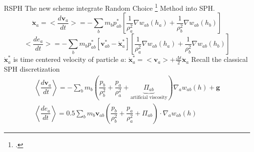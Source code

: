 \documentclass{beamer}
\begin{document}
\begin{frame}{RSPH}
The new scheme integrate Random Choice \footcite{chorin1976random} Method into SPH.
\begin{equation}
\ddot{\textbf{x}}_{a} = <\dfrac{d \textbf{v}_{a}}{dt}>= -\sum_{b} m_{b} p_{a b}^{\ast} \left[\frac{1}{\rho_{a}^2} \nabla w_{a b}(h_{a}) + \frac{1}{\rho_{b}^2} \nabla w_{a b}(h_{b}) \right]
\label{eq:gov-gsph-v-simple-form}
\end{equation}
\begin{equation}
<\dfrac{d e_{a}}{dt}>= - \sum_{b} m_{b} p_{a b}^{\ast} [\textbf{v}_{a b}^{\ast} - \dot{\textbf{x}}_{a}^{\ast}] \left[\frac{1}{\rho_{a}^2} \nabla w_{a b}(h_{a}) + \frac{1}{\rho_{b}^2} \nabla w_{a b}(h_{b}) \right]
\label{eq:gov-gsph-e-simple-form}
\end{equation}
$\dot{\textbf{x}}_{a}^{\ast}$ is time centered velocity of particle $a$: $\dot{\textbf{x}}_{a}^{\ast} = <\textbf{v}_{a}> + \frac{\Delta t}{2} \ddot{\textbf{x}}_{a}$
Recall the classical SPH discretization
\begin{align}
\left\langle\dfrac{d \textbf{v}_a}{d t}\right\rangle = -\sum_b m_b \left(\dfrac{p_b}{\rho_b^2} + \dfrac{p_a}{\rho_a^2} + \underbrace{\Pi_{ab}}_\text{artificial viscosity} \right) \nabla_a w_{a b}\left(h\right) +\textbf{g} \label{eq:ns-sph-v} \\
\left\langle\dfrac{d e_a}{d t}\right\rangle=
 0.5\sum_b m_b \textbf{v}_{a b}\left(\dfrac{p_b}{\rho_b^2} + \dfrac{p_a}{\rho_a^2} + \Pi_{ab}\right) \cdot \nabla_a w_{a b}\left(h\right) \label{eq:ns-sph-e}
\end{align}
\end{frame}
\end{document}
